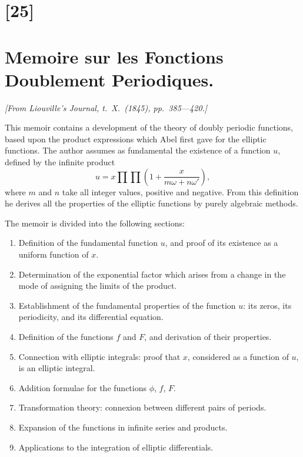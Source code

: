 \documentclass[11pt,a4paper]{book}
\begin{document}
\newpage
\section*{[25]}
\section*{Memoire sur les Fonctions Doublement Periodiques.}

\textit{[From Liouville's Journal, t.~X.~(1845), pp.~385---420.]}

\bigskip
\setcounter{page}{156}

This memoir contains a development of the theory of doubly periodic functions,
based upon the product expressions which Abel first gave for the elliptic functions.
The author assumes as fundamental the existence of a function $u$, defined by the
infinite product
\[
u = x \prod \prod \left(1 + \frac{x}{m\omega + n\omega'}\right),\]
where $m$ and $n$ take all integer values, positive and negative. From this definition he
derives all the properties of the elliptic functions by purely algebraic methods.

The memoir is divided into the following sections:
\begin{enumerate}
\item Definition of the fundamental function $u$, and proof of its existence as a
uniform function of $x$.
\item Determination of the exponential factor which arises from a change in the
mode of assigning the limits of the product.
\item Establishment of the fundamental properties of the function $u$: its zeros,
its periodicity, and its differential equation.
\item Definition of the functions $f$ and $F$, and derivation of their properties.
\item Connection with elliptic integrals: proof that $x$, considered as a function
of $u$, is an elliptic integral.
\item Addition formulae for the functions $\phi$, $f$, $F$.
\item Transformation theory: connexion between different pairs of periods.
\item Expansion of the functions in infinite series and products.
\item Applications to the integration of elliptic differentials.
\end{enumerate}
\end{document}
